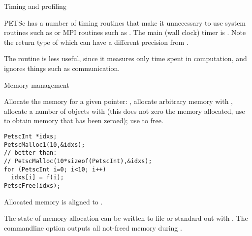  {Timing and profiling}

PETSc has a number of timing routines that make it unnecessary to
use system routines such as 
or MPI routines such as .
The main (wall clock) timer is .
Note the return type of  which
can have a different precision from .

The routine  is less useful, since it measures only
time spent in computation, and ignores things such as communication.

 {Memory management}
\label{sec:petscmalloc}

Allocate the memory for a given pointer: ,
allocate arbitrary memory with ,
allocate a number of objects with 
(this does not zero the memory allocated,
 use  to obtain memory that has been zeroed);
use  to free.
\begin{lstlisting}
PetscInt *idxs;
PetscMalloc1(10,&idxs);
// better than:
// PetscMalloc(10*sizeof(PetscInt),&idxs);
for (PetscInt i=0; i<10; i++)
  idxs[i] = f(i);
PetscFree(idxs);
\end{lstlisting}
Allocated memory is aligned to .

The state of memory allocation can be written to file or standard out
with . The commandline option
 outputs all not-freed memory during
.
